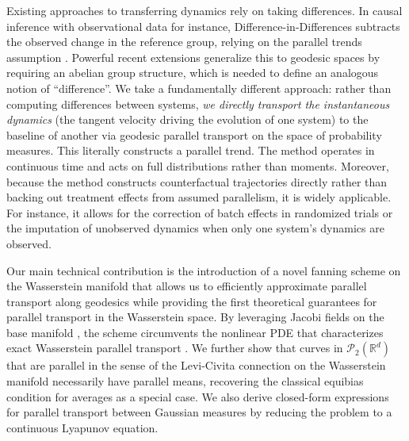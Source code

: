 \documentclass[11pt]{article}
\begin{document}
Existing approaches to transferring dynamics rely on taking differences. In causal inference with observational data for instance, Difference-in-Differences subtracts the observed change in the reference group, relying on the parallel trends assumption \citep{abadie2005semiparametric, ashenfelter1985using}. Powerful recent extensions \citep[e.g.][]{zhou2025geodesic} generalize this to geodesic spaces by requiring an abelian group structure, which is needed to define an analogous notion of ``difference''. We take a fundamentally different approach: rather than computing differences between systems, \emph{we directly transport the instantaneous dynamics} (the tangent velocity driving the evolution of one system) to the baseline of another via geodesic parallel transport on the space of probability measures. This literally constructs a parallel trend. The method operates in continuous time and acts on full distributions rather than moments. Moreover, because the method constructs counterfactual trajectories directly rather than backing out treatment effects from assumed parallelism, it is widely applicable. For instance, it allows for the correction of batch effects in randomized trials or the imputation of unobserved dynamics when only one system's dynamics are observed. 

Our main technical contribution is the introduction of a novel fanning scheme \citep{louis2018fanning} on the Wasserstein manifold that allows us to efficiently approximate parallel transport along geodesics while providing the first theoretical guarantees for parallel transport in the Wasserstein space. By leveraging Jacobi fields on the base manifold \citep{gigli2012second}, the scheme circumvents the nonlinear PDE that characterizes exact Wasserstein parallel transport \citep{ambrosio2008construction}. We further show that curves in $\mathcal{P}_2(\mathbb{R}^d)$ that are parallel in the sense of the Levi-Civita connection on the Wasserstein manifold necessarily have parallel means, recovering the classical equibias condition \citep[e.g.][]{sofer2016} for averages as a special case. We also derive closed-form expressions for parallel transport between Gaussian measures by reducing the problem to a continuous Lyapunov equation.
\end{document}

